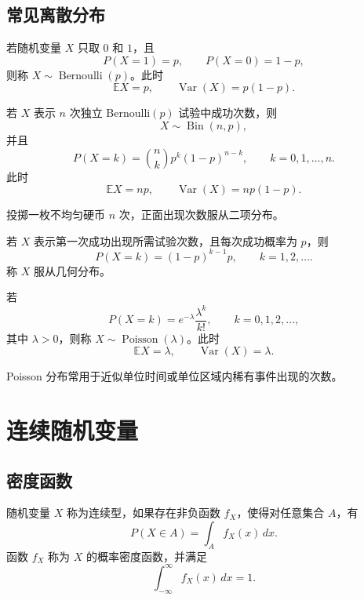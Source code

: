 \subsection{常见离散分布}

\begin{definition}[Bernoulli 分布]
若随机变量 $X$ 只取 $0$ 和 $1$，且
\[
    P(X=1)=p,
    \qquad
    P(X=0)=1-p,
\]
则称 $X\sim\operatorname{Bernoulli}(p)$。此时
\[
    \mathbb{E}X=p,
    \qquad
    \operatorname{Var}(X)=p(1-p).
\]
\end{definition}

\begin{definition}[二项分布]
若 $X$ 表示 $n$ 次独立 Bernoulli$(p)$ 试验中成功次数，则
\[
    X\sim\operatorname{Bin}(n,p),
\]
并且
\[
    P(X=k)=\binom nk p^k(1-p)^{n-k},
    \qquad k=0,1,\dots,n.
\]
此时
\[
    \mathbb{E}X=np,
    \qquad
    \operatorname{Var}(X)=np(1-p).
\]
\end{definition}

\begin{example}
投掷一枚不均匀硬币 $n$ 次，正面出现次数服从二项分布。
\end{example}

\begin{definition}[几何分布]
若 $X$ 表示第一次成功出现所需试验次数，且每次成功概率为 $p$，则
\[
    P(X=k)=(1-p)^{k-1}p,
    \qquad k=1,2,\dots.
\]
称 $X$ 服从几何分布。
\end{definition}

\begin{definition}[Poisson 分布]
若
\[
    P(X=k)=e^{-\lambda}\frac{\lambda^k}{k!},
    \qquad k=0,1,2,\dots,
\]
其中 $\lambda>0$，则称 $X\sim\operatorname{Poisson}(\lambda)$。此时
\[
    \mathbb{E}X=\lambda,
    \qquad
    \operatorname{Var}(X)=\lambda.
\]
\end{definition}

\begin{remark}
Poisson 分布常用于近似单位时间或单位区域内稀有事件出现的次数。
\end{remark}

\section{连续随机变量}

\subsection{密度函数}

\begin{definition}[概率密度函数]
随机变量 $X$ 称为连续型，如果存在非负函数 $f_X$，使得对任意集合 $A$，有
\[
    P(X\in A)=\int_A f_X(x)\,dx.
\]
函数 $f_X$ 称为 $X$ 的概率密度函数，并满足
\[
    \int_{-\infty}^{\infty}f_X(x)\,dx=1.
\]
\end{definition}

